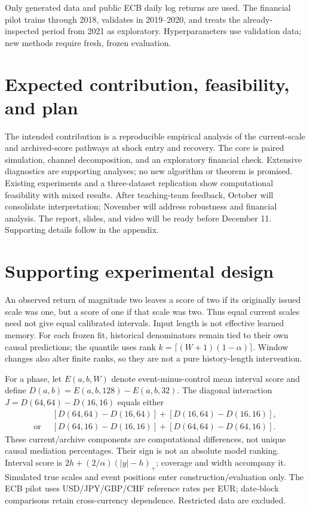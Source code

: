 \documentclass{article}
\begin{document}
Only generated data and public ECB daily log returns are used. The financial
pilot trains through 2018, validates in 2019--2020, and treats the
already-inspected period from 2021 as exploratory. Hyperparameters use
validation data; new methods require fresh, frozen evaluation.

\section{Expected contribution, feasibility, and plan}
The intended contribution is a reproducible empirical analysis of the
current-scale and archived-score pathways at shock entry and recovery.
The core is paired simulation, channel decomposition, and an exploratory
financial check. Extensive diagnostics are supporting analyses; no new
algorithm or theorem is promised. Existing experiments and a three-dataset
replication show computational feasibility with mixed results.
After teaching-team feedback, October will consolidate interpretation;
November will address robustness and financial analysis. The report, slides,
and video will be ready before December 11. Supporting details follow in
the appendix.

\clearpage
\appendix
\renewcommand{\thesection}{Appendix~\Alph{section}}
\section{Supporting experimental design}
An observed return of magnitude two leaves a score of two if its originally
issued scale was one, but a score of one if that scale was two. Thus equal
current scales need not give equal calibrated intervals. Input length is not
effective learned memory. For each frozen fit, historical denominators remain
tied to their own causal predictions; the quantile uses rank
$k=\lceil(W+1)(1-\alpha)\rceil$. Window changes also alter finite ranks, so they
are not a pure history-length intervention.

For a phase, let $E(a,b,W)$ denote event-minus-control mean interval score and
define $D(a,b)=E(a,b,128)-E(a,b,32)$. The diagonal interaction
$J=D(64,64)-D(16,16)$ equals either
\[
\begin{aligned}
 &[D(64,64)-D(16,64)]+[D(16,64)-D(16,16)],\\
 \text{or }\
 &[D(64,16)-D(16,16)]+[D(64,64)-D(64,16)].
\end{aligned}
\]
These current/archive components are computational differences, not unique
causal mediation percentages. Their sign is not an absolute model ranking.
Interval score is $2h+(2/\alpha)(|y|-h)_+$; coverage and width accompany it.
Simulated true scales and event positions enter construction/evaluation only.
The ECB pilot uses USD/JPY/GBP/CHF reference rates per EUR; date-block
comparisons retain cross-currency dependence. Restricted data are excluded.
\end{document}
